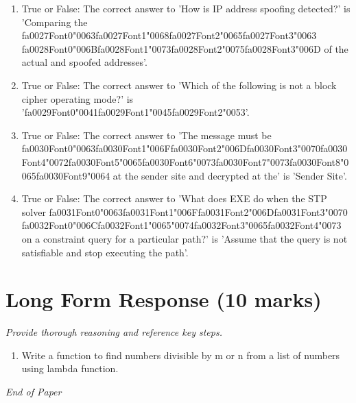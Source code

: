 \documentclass[12pt]{article}
\begin{document}
\begin{enumerate}[label=\arabic*.]
\item True or False: The correct answer to 'How is IP address spoofing detected?' is 'Comparing the {\csname fa0027Font0\endcsname\char"0063}{\csname fa0027Font1\endcsname\char"0068}{\csname fa0027Font2\endcsname\char"0065}{\csname fa0027Font3\endcsname\char"0063} {\csname fa0028Font0\endcsname\char"006B}{\csname fa0028Font1\endcsname\char"0073}{\csname fa0028Font2\endcsname\char"0075}{\csname fa0028Font3\endcsname\char"006D} of the actual and spoofed addresses'.
\item True or False: The correct answer to 'Which of the following is not a block cipher operating mode?' is '{\csname fa0029Font0\endcsname\char"0041}{\csname fa0029Font1\endcsname\char"0045}{\csname fa0029Font2\endcsname\char"0053}'.
\item True or False: The correct answer to 'The message must be {\csname fa0030Font0\endcsname\char"0063}{\csname fa0030Font1\endcsname\char"006F}{\csname fa0030Font2\endcsname\char"006D}{\csname fa0030Font3\endcsname\char"0070}{\csname fa0030Font4\endcsname\char"0072}{\csname fa0030Font5\endcsname\char"0065}{\csname fa0030Font6\endcsname\char"0073}{\csname fa0030Font7\endcsname\char"0073}{\csname fa0030Font8\endcsname\char"0065}{\csname fa0030Font9\endcsname\char"0064} at the sender site and decrypted at the' is 'Sender Site'.
\item True or False: The correct answer to 'What does EXE do when the STP solver {\csname fa0031Font0\endcsname\char"0063}{\csname fa0031Font1\endcsname\char"006F}{\csname fa0031Font2\endcsname\char"006D}{\csname fa0031Font3\endcsname\char"0070} {\csname fa0032Font0\endcsname\char"006C}{\csname fa0032Font1\endcsname\char"0065}{\char"0074}{\csname fa0032Font3\endcsname\char"0065}{\csname fa0032Font4\endcsname\char"0073} on a constraint query for a particular path?' is 'Assume that the query is not satisfiable and stop executing the path'.
\end{enumerate}

\section*{Long Form Response (10 marks)}
\textit{Provide thorough reasoning and reference key steps.}
\begin{enumerate}[label=\arabic*.]
\item Write a function to find numbers divisible by m or n from a list of numbers using lambda
function.
\end{enumerate}

\vfill
\noindent\textit{End of Paper}
\end{document}

